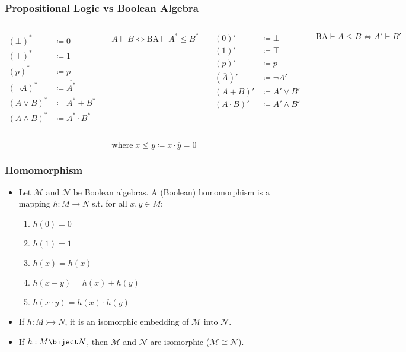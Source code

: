 \documentclass[UTF8,aspectratio=43,11pt,colorlinks,compress,openany]{beamer}%
\begin{document}
\begin{frame}\frametitle{Propositional Logic vs Boolean Algebra}
	\begin{columns}
			\begin{align*}
			(\bot)^*&\coloneqq 0\\
			(\top)^*&\coloneqq 1\\
			(p)^*&\coloneqq p\\
			(\neg A)^*&\coloneqq \overline{A^*}\\
			(A\vee B)^*&\coloneqq A^*+B^*\\
			(A\wedge B)^*&\coloneqq A^*\cdot B^*
			\end{align*}\setlength\abovedisplayskip{0pt}
			\begin{block}{}
				\[A\vdash B\iff\mathrm{BA}\vdash A^*\leq B^*\]
			\end{block}
			\begin{align*}
			(0)'&\coloneqq \bot\\
			(1)'&\coloneqq \top\\
			(p)'&\coloneqq p\\
			\left(\overline{A}\right)'&\coloneqq \neg A'\\
			(A+B)'&\coloneqq A'\vee B'\\
			(A\cdot B)'&\coloneqq A'\wedge B'
			\end{align*}\setlength\abovedisplayskip{0pt}
			\begin{block}{}
				\[\mathrm{BA}\vdash A\leq B\iff A'\vdash B'\]
			\end{block}
	\end{columns}
	\[\text{where}\; x\leq y\coloneqq x\cdot\overline{y}=0\]
\end{frame}

\begin{frame}\frametitle{Homomorphism}
	\begin{itemize}
		\item Let $\mathcal{M}$ and $\mathcal{N}$ be Boolean algebras. A (Boolean) homomorphism is a mapping $h: M\to N$ s.t. for all $x,y\in M$:
		\begin{enumerate}
			\item $h(0)=0$
			\item $h(1)=1$
			\item $h(\overline{x})=\overline{h(x)}$
			\item $h(x+y)=h(x)+h(y)$
			\item $h(x\cdot y)=h(x)\cdot h(y)$
		\end{enumerate}
		\item If $h: M\rightarrowtail N$, it is an isomorphic embedding of $\mathcal{M}$ into $\mathcal{N}$.
		\item If $h: M\biject N$, then $\mathcal{M}$ and $\mathcal{N}$ are isomorphic ($\mathcal{M}\cong\mathcal{N}$). 
	\end{itemize}
\end{frame}
\end{document}
